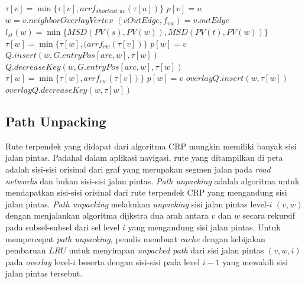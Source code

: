 \begin{algorithm}
{\begin{minipage}{\textwidth}
\begin{algorithmic}[1]
       
            \State $\tau[v]=\min\{\tau[v],arr f_{shortcut\_uv}(\tau[u])\}$  
            \State $p[v]=u$     
            \State $w=v.neighborOverlayVertex$
            \State $(vOutEdge,f_{vw})=v.outEdge$
            \State $l_{st}(w)=\min\{MSD(PV(s), PV(w)), MSD(PV(t), PV(w))\}$
             
                    \State $\tau[w]=\min\{\tau[w],(arr f_{vw}(\tau[v])\}$  
                    \State $p[w]=v$     
                        \State $Q.insert(w,G.entryPos[arc,w],\tau[w])$
                    \Else
                     \State   $Q.decreaseKey(w,G.entryPos[arc,w],\tau[w])$
                    \EndIf
                \EndIf
            \Else
                    \State $\tau[w]=\min\{\tau[w],arr f_{vw}(\tau[v])\}$  
                    \State $p[w]=v$    
                        \State $overlayQ.insert(w,\tau[w])$
                    \Else
                      \State  $overlayQ.decreaseKey(w,\tau[w])$
                    \EndIf
                \EndIf          
            \EndIf
                
            
        \EndIf
       
    \EndProcedure
\end{algorithmic}
\end{minipage}%
}
\end{algorithm}


\subsection{Path Unpacking}
\label{subsec:tdcrp-path-unpacking}
Rute terpendek yang didapat dari algoritma CRP mungkin memiliki banyak sisi jalan pintas. Padahal dalam aplikasi navigasi, rute yang ditampilkan di peta adalah sisi-sisi orisinal dari graf yang merupakan segmen jalan pada \textit{road networks} dan bukan sisi-sisi jalan pintas. \textit{Path unpacking} adalah algoritma untuk mendapatkan sisi-sisi orisinal dari rute terpendek CRP yang mengandung sisi jalan pintas. \textit{Path unpacking} melakukan \textit{unpacking} sisi jalan pintas level-$i$ $(v,w)$ dengan menjalankan algoritma dijkstra dua arah antara $v$ dan $w$ secara rekursif pada subsel-subsel dari sel level $i$ yang mengandung sisi jalan pintas. Untuk mempercepat \textit{path unpacking}, penulis membuat \textit{cache} dengan kebijakan pembaruan $LRU$ untuk menyimpan \textit{unpacked path} dari sisi jalan pintas $(v,w,i)$ pada \textit{overlay} level-$i$ beserta dengan sisi-sisi pada level $i-1$ yang mewakili sisi jalan pintas tersebut.


